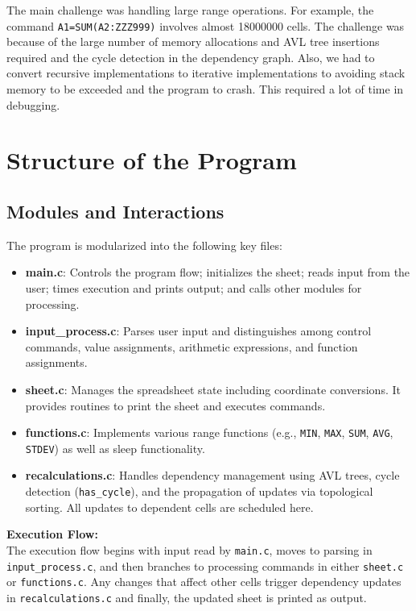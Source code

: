 \documentclass[12pt,letterpaper,onecolumn]{exam}
\begin{document}
The main challenge was handling large range operations. For example, the command \texttt{A1=SUM(A2:ZZZ999)} involves almost 18000000 cells. The challenge was because of the large number of memory allocations and AVL tree insertions required and the cycle detection in the dependency graph. Also, we had to convert recursive implementations to iterative implementations to avoiding stack memory to be exceeded and the program to crash. This required a lot of time in debugging.

\section{Structure of the Program}

\subsection{Modules and Interactions}

The program is modularized into the following key files:

\begin{itemize}
    \item \textbf{main.c}: Controls the program flow; initializes the sheet; reads input from the user; times execution and prints output; and calls other modules for processing.
    \item \textbf{input\_process.c}: Parses user input and distinguishes among control commands, value assignments, arithmetic expressions, and function assignments.
    \item \textbf{sheet.c}: Manages the spreadsheet state including coordinate conversions. It provides routines to print the sheet and executes commands.
    \item \textbf{functions.c}: Implements various range functions (e.g., \texttt{MIN}, \texttt{MAX}, \texttt{SUM}, \texttt{AVG}, \texttt{STDEV}) as well as sleep functionality.
    \item \textbf{recalculations.c}: Handles dependency management using AVL trees, cycle detection (\texttt{has\_cycle}), and the propagation of updates via topological sorting. All updates to dependent cells are scheduled here.
\end{itemize}

\noindent \textbf{Execution Flow:}\\
The execution flow begins with input read by \texttt{main.c}, moves to parsing in \texttt{input\_process.c}, and then branches to processing commands in either \texttt{sheet.c} or \texttt{functions.c}. Any changes that affect other cells trigger dependency updates in \texttt{recalculations.c} and finally, the updated sheet is printed as output.
\end{document}
